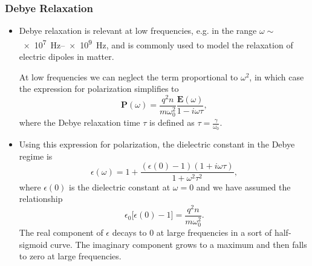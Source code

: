 \documentclass[11pt, a4paper]{article}
\renewcommand{\vec}[1]{\bm{#1}} %
\newcommand{\E}{\vec{E}} %
\renewcommand{\P}{\vec{P}}  %
\newcommand{\ee}{\epsilon_{0}}  %
\begin{document}
\subsubsection{Debye Relaxation}
\begin{itemize}
    \item Debye relaxation is relevant at low frequencies, e.g. in the range $ \omega \sim $ \SIrange{e7}{e9}{\hertz}, and is commonly used to model the relaxation of electric dipoles in matter.

    At low frequencies we can neglect the term proportional to $ \omega^{2} $, in which case the expression for polarization simplifies to
    \begin{equation*}
        \P(\omega) = \frac{q^{2}n}{m\omega_{0}^{2}} \frac{\E(\omega)}{1 - i\omega\tau},
    \end{equation*}
    where the Debye relaxation time $ \tau $ is defined as $ \tau = \frac{\gamma}{\omega_{0}} $.
    
    \item Using this expression for polarization, the dielectric constant in the Debye regime is
    \begin{equation*}
        \epsilon(\omega) = 1 + \frac{(\epsilon(0) -1)(1 + i\omega\tau)}{1 + \omega^{2}\tau^{2}},
    \end{equation*}
    where $ \epsilon(0) $ is the dielectric constant at $ \omega = 0 $ and we have assumed the relationship
    \begin{equation*}
        \ee \big[ \epsilon(0) -1 \big] = \frac{q^{2}n}{m\omega_{0}^{2}}.
    \end{equation*}
    The real component of $ \epsilon $ decays to 0 at large frequencies in a sort of half-sigmoid curve. The imaginary component grows to a maximum and then falls to zero at large frequencies.
\end{itemize}
\end{document}
